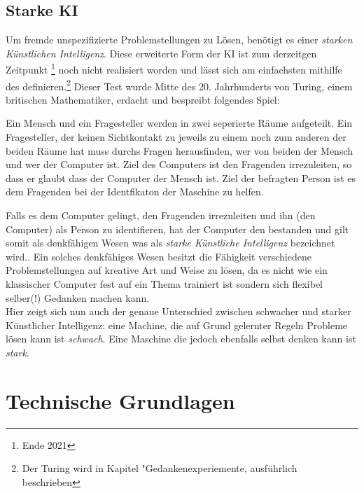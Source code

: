 \documentclass[a4paper,12pt,german,ngerman]{report}
\begin{document}
    \section{Starke KI}
    Um fremde unspezifizierte Problemstellungen zu Lösen, benötigt es einer \emph{starken Künstlichen Intelligenz}.
    Diese erweiterte Form der KI ist zum derzeitgen Zeitpunkt \footnote{Ende 2021} noch nicht realisiert worden und lässt sich am
    einfachsten mithilfe des  definieren.\footnote{Der Turing wird in Kapitel "Gedankenexperiemente, ausführlich beschrieben}
    Dieser Test wurde Mitte des 20. Jahrhunderts von Turing, einem britischen Mathematiker, erdacht und bespreibt folgendes Spiel:
    \begin{displayquote}
        Ein Mensch und ein Fragesteller werden in zwei seperierte
        Räume aufgeteilt. Ein Fragesteller, der keinen Sichtkontakt zu jeweils zu einem noch zum anderen der beiden Räume hat
        muss durchs Fragen herausfinden, wer von beiden der Mensch und wer der Computer ist.
        Ziel des Computers ist den Fragenden irrezuleiten, so dass er glaubt dass der Computer der Mensch ist.
        Ziel der befragten Person ist es dem Fragenden bei der Identfikaton der Maschine zu helfen.\cite{turing1950computing}
    \end{displayquote}
    Falls es dem Computer gelingt, den Fragenden irrezuleiten und ihn (den Computer) als Person zu identifieren, hat der Computer
    den  bestanden und gilt somit als denkfähigen Wesen was als \emph{starke Künstliche Intelligenz}
    bezeichnet wird.\cite{oppy&dowe2020turingtest}. Ein solches denkfähiges Wesen besitzt die Fähigkeit verschiedene Problemstellungen
    auf kreative Art und Weise zu lösen, da es nicht wie ein klassischer Computer fest auf ein Thema trainiert ist sondern
    sich flexibel selber(!) Gedanken machen kann.\\

    Hier zeigt sich nun auch der genaue Unterschied zwischen schwacher und starker Künstlicher Intelligenz: eine Machine,
    die auf Grund gelernter Regeln Probleme lösen kann ist \emph{schwach}. Eine Maschine die jedoch ebenfalls selbst denken
    kann ist \emph{stark}.

    \chapter{Technische Grundlagen}
\end{document}

